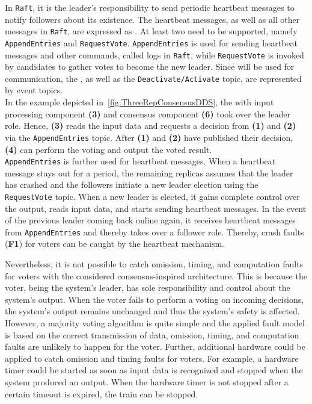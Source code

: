 In \texttt{Raft}, it is the leader's responsibility to send periodic heartbeat messages to notify followers about its existence.
The heartbeat messages, as well as all other messages in \texttt{Raft}, are expressed as .
At least two  need to be supported, namely \texttt{AppendEntries} and \texttt{RequestVote}.
\texttt{AppendEntries} is used for sending heartbeat messages and other commands, called logs in \texttt{Raft}, while \texttt{RequestVote} is invoked by candidates to gather votes to become the new leader.
Since  will be used for communication, the , as well as the \texttt{Deactivate/Activate} topic, are represented by  event topics.
\\

In the example depicted in~\autoref{fig:ThreeRepConsensusDDS}, the  with input processing component \textbf{(3)} and consensus component \textbf{(6)} took over the leader role.
Hence, \textbf{(3)} reads the input data and requests a decision from \textbf{(1)} and \textbf{(2)} via the \texttt{AppendEntries} topic.
After \textbf{(1)} and \textbf{(2)} have published their decision, \textbf{(4)} can perform the voting and output the voted result.
\\

\texttt{AppendEntries} is further used for heartbeat messages.
When a heartbeat message stays out for a period, the remaining replicas assumes that the leader has crashed and the followers initiate a new leader election using the \texttt{RequestVote} topic.
When a new leader is elected, it gains complete control over the output, reads input data, and starts sending heartbeat messages.
In the event of the previous leader coming back online again, it receives heartbeat messages from \texttt{AppendEntries} and thereby takes over a follower role.
Thereby, crash faults (\textbf{F1}) for voters can be caught by the heartbeat mechanism.

Nevertheless, it is not possible to catch omission, timing, and computation faults for voters with the considered consensus-inspired architecture.
This is because the voter, being the system's leader, has sole responsibility and control about the system's output.
When the voter fails to perform a voting on incoming decisions, the system's output remains unchanged and thus the system's safety is affected.
However, a majority voting algorithm is quite simple and the applied fault model is based on the correct transmission of data, omission, timing, and computation faults are unlikely to happen for the voter.
Further, additional hardware could be applied to catch omission and timing faults for voters.
For example, a hardware timer could be started as soon as input data is recognized and stopped when the system produced an output.
When the hardware timer is not stopped after a certain timeout is expired, the train can be stopped.
\\

